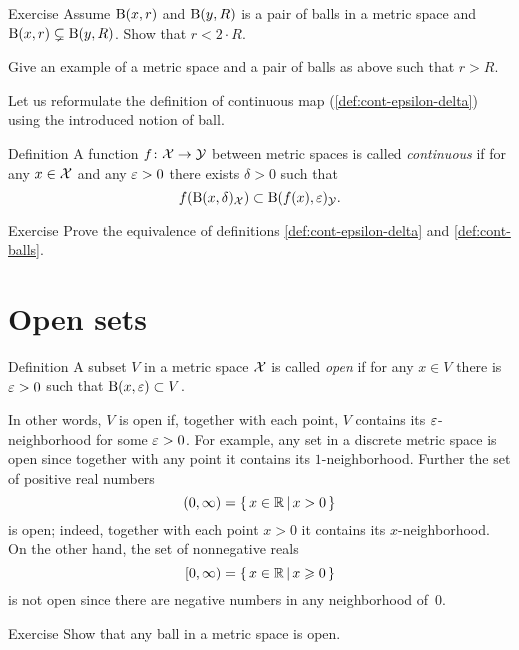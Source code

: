 \begin{thm}{Exercise}
Assume $\mathrm{B}(x,r)$  and $\mathrm{B}(y,R)$ is a pair of balls in a metric space 
and $\mathrm{B}(x,r)\subsetneq \mathrm{B}(y,R)$.
Show that $r<2\cdot R$.

Give an example of a metric space and a pair of balls as above such that $r> R$.
\end{thm}

Let us reformulate the definition of continuous map (\ref{def:cont-epsilon-delta}) using the introduced notion of ball.

\begin{thm}{Definition}\label{def:cont-balls}
A function $f\colon\mathcal{X}\to\mathcal{Y}$ between metric spaces is called \emph{continuous} if for any $x\in \mathcal{X}$ and any $\varepsilon>0$ there exists $\delta>0$ such that 
\[f(\mathrm{B}(x,\delta)_{\mathcal{X}})\subset\mathrm{B}(f(x),\varepsilon)_{\mathcal{Y}}.\]

\end{thm}

\begin{thm}{Exercise}
Prove the equivalence of definitions \ref{def:cont-epsilon-delta} and \ref{def:cont-balls}.
\end{thm}



\section{Open sets}

\begin{thm}{Definition}\label{def:open}
A subset $V$ in a metric space $\mathcal{X}$ is called \emph{open} if for any $x\in V$ there is $\varepsilon>0$ such that $\mathrm{B}(x,\varepsilon)\subset V$.
\end{thm}

In other words, $V$ is open if, together with each point, $V$ contains its $\varepsilon$-neighborhood for some $\varepsilon>0$.
For example, any set in a discrete metric space is open since together with any point it contains its $1$-neighborhood.
Further the set of positive real numbers
\[(0,\infty)=\left\{\,{x\in\mathbb{R}}\,\middle|\,{x>0}\,\right\}\] 
is open; indeed, together with each point $x>0$ it contains its $x$-neighborhood.
On the other hand, the set of nonnegative reals 
\[[0,\infty)=\left\{\,{x\in\mathbb{R}}\,\middle|\,{x\geqslant0}\,\right\}\]
is not open since there are negative numbers in any neighborhood of~$0$.

\begin{thm}{Exercise}\label{ex:ball-is-open}
Show that any ball in a metric space is open.
\end{thm}

